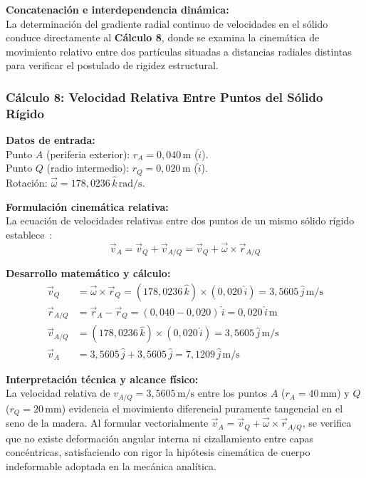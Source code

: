 \documentclass[12pt,a4paper]{article}
\begin{document}
\noindent\textbf{Concatenación e interdependencia dinámica:}\\
La determinación del gradiente radial continuo de velocidades en el sólido conduce directamente al \textbf{Cálculo 8}, donde se examina la cinemática de movimiento relativo entre dos partículas situadas a distancias radiales distintas para verificar el postulado de rigidez estructural.
\vspace{12pt}

\subsubsection{Cálculo 8: Velocidad Relativa Entre Puntos del Sólido Rígido}

\noindent\textbf{Datos de entrada:}\\
Punto $A$ (periferia exterior): $r_A = 0{,}040\,\text{m}$ ($\hat{i}$).\\
Punto $Q$ (radio intermedio): $r_Q = 0{,}020\,\text{m}$ ($\hat{i}$).\\
Rotación: $\vec{\omega} = 178{,}0236\,\hat{k}\,\text{rad/s}$.
\vspace{6pt}

\noindent\textbf{Formulación cinemática relativa:}\\
La ecuación de velocidades relativas entre dos puntos de un mismo sólido rígido establece~\cite{hibbeler2016, beer2017}:
\begin{equation}
    \vec{v}_A = \vec{v}_Q + \vec{v}_{A/Q} = \vec{v}_Q + \vec{\omega} \times \vec{r}_{A/Q}
\end{equation}
\vspace{6pt}

\noindent\textbf{Desarrollo matemático y cálculo:}
\begin{align}
    \vec{v}_Q &= \vec{\omega} \times \vec{r}_Q = (178{,}0236\,\hat{k}) \times (0{,}020\,\hat{i}) = 3{,}5605\,\hat{j}\,\text{m/s} \\[6pt]
    \vec{r}_{A/Q} &= \vec{r}_A - \vec{r}_Q = (0{,}040 - 0{,}020)\,\hat{i} = 0{,}020\,\hat{i}\,\text{m} \\[6pt]
    \vec{v}_{A/Q} &= (178{,}0236\,\hat{k}) \times (0{,}020\,\hat{i}) = 3{,}5605\,\hat{j}\,\text{m/s} \\[6pt]
    \vec{v}_A &= 3{,}5605\,\hat{j} + 3{,}5605\,\hat{j} = \boxed{7{,}1209\,\hat{j}\,\text{m/s}}
\end{align}
\vspace{6pt}

\noindent\textbf{Interpretación técnica y alcance físico:}\\
La velocidad relativa de $v_{A/Q} = 3{,}5605\,\text{m/s}$ entre los puntos $A$ ($r_A = 40\,\text{mm}$) y $Q$ ($r_Q = 20\,\text{mm}$) evidencia el movimiento diferencial puramente tangencial en el seno de la madera. Al formular vectorialmente $\vec{v}_A = \vec{v}_Q + \vec{\omega}\times\vec{r}_{A/Q}$, se verifica que no existe deformación angular interna ni cizallamiento entre capas concéntricas, satisfaciendo con rigor la hipótesis cinemática de cuerpo indeformable adoptada en la mecánica analítica.
\end{document}
